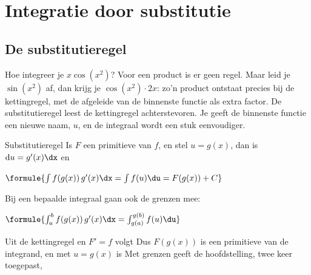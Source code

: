 
\begin{oefeningen}
\end{oefeningen}

\section{Integratie door substitutie}

\subsection{De substitutieregel}

Hoe integreer je $x\cos(x^2)$? Voor een product is er geen regel. Maar leid je $\sin(x^2)$ af, dan krijg je $\cos(x^2) \cdot 2x$: zo'n product ontstaat precies bij de kettingregel, met de afgeleide van de binnenste functie als extra factor. De substitutieregel leest de kettingregel achterstevoren. Je geeft de binnenste functie een nieuwe naam, $u$, en de integraal wordt een stuk eenvoudiger.


\begin{theorie}
\begin{stelling}{Substitutieregel}
Is $F$ een primitieve van $f$, en stel $u = g(x)$, dan is $\mathrm{d}u = g'(x)\dx$ en

\vspace{1mm}
\qquad $\formule{\int f(g(x))\,g'(x)\dx = \int f(u)\du = F(g(x)) + C}$

\vspace{1.5mm}
Bij een bepaalde integraal gaan ook de grenzen mee:

\vspace{1mm}
\qquad $\formule{\int_a^b f(g(x))\,g'(x)\dx = \int_{g(a)}^{g(b)} f(u)\du}$
\end{stelling}

\begin{bewijs}
Uit de kettingregel en $F' = f$ volgt
Dus $F(g(x))$ is een primitieve van de integrand, en met $u = g(x)$ is
Met grenzen geeft de hoofdstelling, twee keer toegepast,
\end{bewijs}
\end{theorie}

